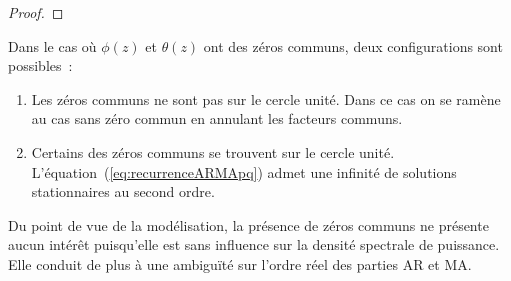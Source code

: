 \begin{proof}



\end{proof}
Dans le cas o\`u $\phi(z)$ et $\theta(z)$ ont des z\'eros communs,
deux configurations sont possibles~:
\begin{enumerate}[label=(\alph*)]
\item Les z\'eros communs ne sont pas sur le cercle unit\'e. Dans ce
cas on se
  ram\`ene au cas sans z\'ero commun en annulant les facteurs communs.
\item Certains des z\'eros communs se trouvent sur le cercle unit\'e.
  L'\'equation~(\ref{eq:recurrenceARMApq}) admet une infinit\'e de solutions
  stationnaires au second ordre.
\end{enumerate}
Du point de vue de la mod\'elisation, la pr\'esence de z\'eros communs
ne pr\'esente aucun int\'er\^{e}t puisqu'elle est sans influence sur
la densit\'e spectrale de puissance. Elle conduit de plus \`a une
ambigu\"{i}t\'e sur l'ordre r\'eel des parties AR et MA.
